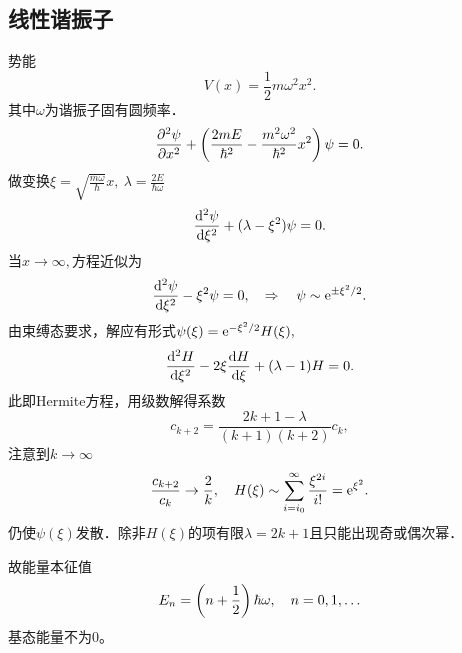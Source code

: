 \def\coursename{跃迁理论}
\def\courseEnglishname{Quantum Mechanics}
\def\teachername{陈新、郭永}
\def\beginday{2022/3/25}
\def\endday{2022/3/26}



\contentfalse

\let\oldr\r
\renewcommand*{\r}{\bm r}						%
\newcommand{\qo}[1]{\bm{\hat #1}\!\mathop{}}	%
\newcommand{\cmm}[2]{\zkh{\hat #1,\hat #2}}		%
\newcommand{\acmm}[2]{\{\hat #1,\hat #2\}}

\newcommand{\Larmor}{\mathrm L}
\newcommand{\Hall}{\mathrm H}

\newcommand{\cyc}{\mathrm c}
\DeclareMathOperator{\Cle}{C}



\firstandforemost

\subsection{线性谐振子}
势能
\[
	V(x)=\frac12m\omega^2x^2.
\]
其中$\omega$为谐振子固有圆频率．
\[
	\pu 2\psi{x}+\kh{\frac{2mE}{\hbar^2}-\frac{m^2\omega^2}{\hbar^2}x^2}\psi=0.
\]
做变换$\xi=\sqrt{\frac{m\omega}\hbar}x,~\lambda=\frac{2E}{\hbar\omega}$
\[
	\dv[2]\psi\xi+(\lambda-\xi^2)\psi=0.
\]
当$x\to\infty,$方程近似为
\[
	\dv[2]\psi\xi-\xi^2\psi=0,\thus\psi\sim\e{\pm\xi^2/2}.
\]
由束缚态要求，解应有形式$\psi(\xi)=\e{-\xi^2/2}H(\xi),$
\[
	\dv[2] H\xi-2\xi\dv H\xi+(\lambda-1)H=0.
\]
此即Hermite方程，用级数解得系数
\[
	c_{k+2}=\frac{2k+1-\lambda}{(k+1)(k+2)}c_k,
\]
注意到$k\to\infty$
\[
	\frac{c_{k+2}}{c_k}\to\frac{2}k,\quad H(\xi)\sim\sum_{i=i_0}^\infty\frac{\xi^{2i}}{i!}=\e{\xi^2}.
\]
仍使$\psi(\xi)$发散．除非$H(\xi)$的项有限$\lambda=2k+1$且只能出现奇或偶次幂．

故能量本征值
\begin{align}
	E_n=\kh{n+\frac12}\hbar\omega,\quad n=0,1,\ldots
\end{align}
基态能量不为0。

